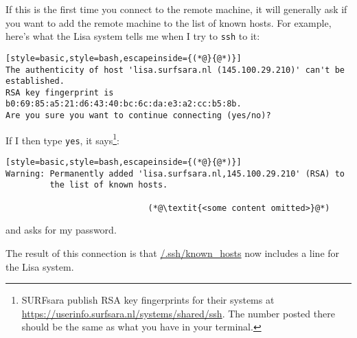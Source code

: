 If this is the first time you connect to the remote machine, it will generally ask if you want to add the remote machine to the list of known hosts. For example, here's what the Lisa system tells me when I try to \texttt{ssh} to it:
\begin{lstlisting}[style=basic,style=bash,escapeinside={(*@}{@*)}]
The authenticity of host 'lisa.surfsara.nl (145.100.29.210)' can't be
established.
RSA key fingerprint is b0:69:85:a5:21:d6:43:40:bc:6c:da:e3:a2:cc:b5:8b.
Are you sure you want to continue connecting (yes/no)?
\end{lstlisting}
If I then type \texttt{yes}, it says\footnote{SURFsara publish RSA key fingerprints for their systems at \url{https://userinfo.surfsara.nl/systems/shared/ssh}. The number posted there should be the same as what you have in your terminal.}:
\begin{lstlisting}[style=basic,style=bash,escapeinside={(*@}{@*)}]
Warning: Permanently added 'lisa.surfsara.nl,145.100.29.210' (RSA) to
         the list of known hosts.

                             (*@\textit{<some content omitted>}@*)
\end{lstlisting}
and asks for my password.

The result of this connection is that \mytilde\url{/.ssh/known_hosts} now includes a line for the Lisa system.










